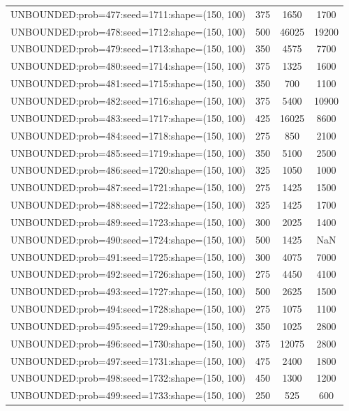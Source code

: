 \begin{longtable}{lccc}
UNBOUNDED:prob=477:seed=1711:shape=(150, 100) &      375 &  1650 &   1700 \\
UNBOUNDED:prob=478:seed=1712:shape=(150, 100) &      500 & 46025 &  19200 \\
UNBOUNDED:prob=479:seed=1713:shape=(150, 100) &      350 &  4575 &   7700 \\
UNBOUNDED:prob=480:seed=1714:shape=(150, 100) &      375 &  1325 &   1600 \\
UNBOUNDED:prob=481:seed=1715:shape=(150, 100) &      350 &   700 &   1100 \\
UNBOUNDED:prob=482:seed=1716:shape=(150, 100) &      375 &  5400 &  10900 \\
UNBOUNDED:prob=483:seed=1717:shape=(150, 100) &      425 & 16025 &   8600 \\
UNBOUNDED:prob=484:seed=1718:shape=(150, 100) &      275 &   850 &   2100 \\
UNBOUNDED:prob=485:seed=1719:shape=(150, 100) &      350 &  5100 &   2500 \\
UNBOUNDED:prob=486:seed=1720:shape=(150, 100) &      325 &  1050 &   1000 \\
UNBOUNDED:prob=487:seed=1721:shape=(150, 100) &      275 &  1425 &   1500 \\
UNBOUNDED:prob=488:seed=1722:shape=(150, 100) &      325 &  1425 &   1700 \\
UNBOUNDED:prob=489:seed=1723:shape=(150, 100) &      300 &  2025 &   1400 \\
UNBOUNDED:prob=490:seed=1724:shape=(150, 100) &      500 &  1425 &    NaN \\
UNBOUNDED:prob=491:seed=1725:shape=(150, 100) &      300 &  4075 &   7000 \\
UNBOUNDED:prob=492:seed=1726:shape=(150, 100) &      275 &  4450 &   4100 \\
UNBOUNDED:prob=493:seed=1727:shape=(150, 100) &      500 &  2625 &   1500 \\
UNBOUNDED:prob=494:seed=1728:shape=(150, 100) &      275 &  1075 &   1100 \\
UNBOUNDED:prob=495:seed=1729:shape=(150, 100) &      350 &  1025 &   2800 \\
UNBOUNDED:prob=496:seed=1730:shape=(150, 100) &      375 & 12075 &   2800 \\
UNBOUNDED:prob=497:seed=1731:shape=(150, 100) &      475 &  2400 &   1800 \\
UNBOUNDED:prob=498:seed=1732:shape=(150, 100) &      450 &  1300 &   1200 \\
UNBOUNDED:prob=499:seed=1733:shape=(150, 100) &      250 &   525 &    600 \\

\end{longtable}

